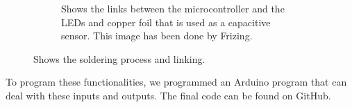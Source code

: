 \documentclass[00_doc.tex]{subfiles}
\begin{document}
\begin{figure}[H]
\begin{subfigure}{.45\textwidth}
            \caption{Shows the links between the microcontroller and the LEDs and copper foil that is 
            used as a capacitive sensor. This image has been done by Frizing. \cite{fritzing}}
            \label{fig:solderingProcess_3}
            \vspace{6mm}
        \end{subfigure}
        \caption{Shows the soldering process and linking.}
        \label{fig:solderingProcess}
    \end{figure}

    \noindent
    To program these functionalities, we programmed an Arduino program that can deal with these inputs 
    and outputs. The final code can be found on GitHub. %
\end{document}
